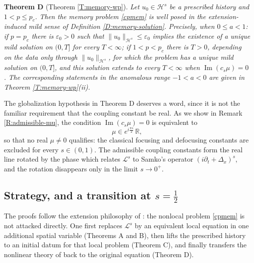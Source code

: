 \documentclass[11pt,letter]{amsart}
\def \R {\mathbb{R}}
\newcommand{\p}{\partial}
\numberwithin{equation}{section}
\newcommand{\ve}{\varepsilon}
\newcommand{\Le}{\mathcal L}
\numberwithin{equation}{section}
\begin{document}
\medskip
\noindent\textbf{Theorem D} (Theorem \ref{T:memory-wp}).
\emph{Let $u_0\in\mathcal H^s$ be a prescribed history and $1<p\le p_c$. Then
the memory problem \eqref{cpmem} is well posed in the extension-induced mild
sense of Definition \ref{D:memory-solution}. Precisely, when $0\le a<1$: if
$p=p_c$ there is $\ve_0>0$ such that $\|u_0\|_{\mathcal H^s}\le\ve_0$ implies
the existence of a unique mild solution on $(0,T]$ for every $T<\infty$; if
$1<p<p_c$ there is $T>0$, depending on the data only through
$\|u_0\|_{\mathcal H^s}$, for which the problem has a unique mild solution on
$(0,T]$, and this solution extends to every $T<\infty$ when
$\operatorname{Im}(c_s\mu)=0$. The corresponding statements in the anomalous
range $-1<a<0$ are given in Theorem \ref{T:memory-wp}(ii).}

\medskip
The globalization hypothesis in Theorem D deserves a word, since it is not the
familiar requirement that the coupling constant be real. As we show in
Remark \ref{R:admissible-mu}, the condition $\operatorname{Im}(c_s\mu)=0$ is
equivalent to
\[
\mu\in e^{i\frac{\pi s}{2}}\,\R ,
\]
so that no real $\mu\neq0$ qualifies: the classical focusing and defocusing
constants are excluded for every $s\in(0,1)$. The admissible coupling constants
form the real line rotated by the phase which relates $\Le^s$ to Samko's
operator $(i\p_t + \Delta_x)^s$, and the rotation disappears only in the limit
$s\to0^+$.


\subsection{Strategy, and a transition at $s=\frac12$}\label{S:des}

The proofs follow the extension philosophy of \cite{CS}: the nonlocal problem
\eqref{cpmem} is not attacked directly. One first replaces $\Le^s$ by an
equivalent local equation in one additional spatial variable (Theorems A and B),
then lifts the prescribed history to an initial datum for that local problem
(Theorem C), and finally transfers the nonlinear theory of \cite{GS1,GS2} back
to the original equation (Theorem D).
\end{document}
